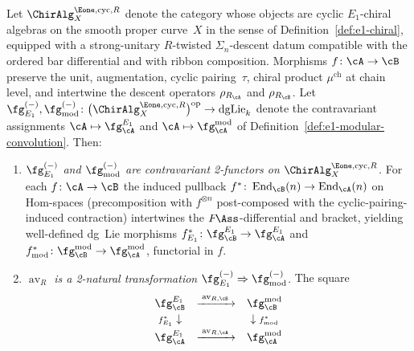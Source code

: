 \begin{theorem}
\label{thm:av-functoriality}
Let $\ChirAlg^{\Eone,\mathrm{cyc},R}_X$ denote the category whose
objects are cyclic $E_1$-chiral algebras on the smooth proper
curve~$X$ in the sense of Definition~\textup{\ref{def:e1-chiral}},
equipped with a strong-unitary $R$-twisted $\Sigma_n$-descent datum
compatible with the ordered bar differential and with ribbon
composition. Morphisms $f\colon \cA \to \cB$ preserve the unit,
augmentation, cyclic pairing~$\tau$, chiral product
$\mu^{\mathrm{ch}}$ at chain level, and intertwine the descent
operators $\rho_{R_\cA}$ and $\rho_{R_\cB}$. Let
$\fg^{(-)}_{E_1}, \fg^{(-)}_{\mathrm{mod}}\colon
\bigl(\ChirAlg^{\Eone,\mathrm{cyc},R}_X\bigr)^{\mathrm{op}}
\to \mathrm{dgLie}_k$
denote the contravariant assignments
$\cA \mapsto \fg^{E_1}_\cA$ and
$\cA \mapsto \fg^{\mathrm{mod}}_\cA$ of
Definition~\textup{\ref{def:e1-modular-convolution}}. Then:
\begin{enumerate}[label=\textup{(\roman*)}]
\item \emph{$\fg^{(-)}_{E_1}$ and $\fg^{(-)}_{\mathrm{mod}}$ are
contravariant 2-functors on $\ChirAlg^{\Eone,\mathrm{cyc},R}_X$.}
For each $f\colon \cA \to \cB$ the induced pullback
$f^* \colon \operatorname{End}_\cB(n) \to \operatorname{End}_\cA(n)$
on Hom-spaces (precomposition with $f^{\otimes n}$ post-composed
with the cyclic-pairing-induced contraction) intertwines the
$F\!\Ass$-differential and bracket, yielding well-defined
dg~Lie morphisms $f^*_{E_1}\colon \fg^{E_1}_\cB \to
\fg^{E_1}_\cA$ and $f^*_{\mathrm{mod}}\colon
\fg^{\mathrm{mod}}_\cB \to \fg^{\mathrm{mod}}_\cA$, functorial in
$f$.
\item \emph{$\operatorname{av}_R$ is a 2-natural transformation
$\fg^{(-)}_{E_1} \Rightarrow \fg^{(-)}_{\mathrm{mod}}$.}
The square
\[
\begin{array}{ccc}
\fg^{E_1}_\cB & \xrightarrow{\;\operatorname{av}_{R,\cB}\;} &
\fg^{\mathrm{mod}}_\cB \\[2pt]
{\scriptstyle f^*_{E_1}}\downarrow & & \downarrow{\scriptstyle f^*_{\mathrm{mod}}} \\[2pt]
\fg^{E_1}_\cA & \xrightarrow{\;\operatorname{av}_{R,\cA}\;} &
\fg^{\mathrm{mod}}_\cA
\end{array}
\]
\end{enumerate}
\end{theorem}
